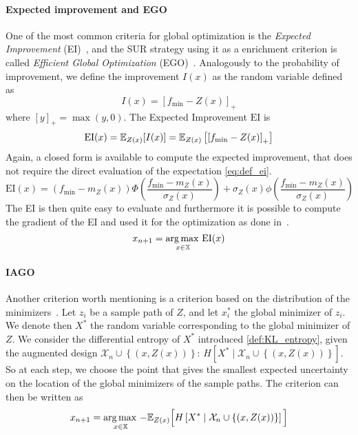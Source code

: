\documentclass[../../Main_ManuscritThese.tex]{subfiles}
\begin{document}
\paragraph{Expected improvement and EGO}
One of the most common criteria for global optimization is the \emph{Expected Improvement} (EI)~\cite{mockus_bayesian_1974}, and the SUR strategy using it as a enrichment criterion is called \emph{Efficient Global Optimization} (EGO)~\cite{jones_efficient_1998}.
Analogously to the probability of improvement, we define the improvement $I(x)$ as the random variable defined as
\begin{equation}
  \label{eq:def_improvement}
  I(x) = {\left[f_{\min} - Z(x)\right]}_+
\end{equation}
where $[y]_+ = \max(y, 0)$.
The Expected Improvement $\mathrm{EI}$ is 
\begin{align}
  \label{eq:def_ei}
  \mathrm{EI}(x) = \mathbb{E}_{Z(x)}[I(x)]  = \mathbb{E}_{Z(x)}\left[\left[f_{\min} - Z(x) \right]_+\right]
\end{align}
Again, a closed form is available to compute the expected improvement, that does not require the direct evaluation of the expectation \cref{eq:def_ei}.
\begin{equation}
  \mathrm{EI}(x) = \left(f_{\min} - m_Z(x)\right) \Phi\left(\frac{f_{\min} - m_Z(x)}{\sigma_Z(x)}\right) + \sigma_Z(x) \phi\left(\frac{f_{\min} - m_Z(x)}{\sigma_Z(x)}\right)
\end{equation}
The EI is then quite easy to evaluate and furthermore it is possible to compute the gradient of the EI and used it for the optimization as done in~\cite{pardalos_differentiating_2015}.
\begin{equation}
  x_{n+1} = \operatorname*{arg\,max \,}_{x\in \mathbb{X}} \mathrm{EI}(x)
\end{equation}

\paragraph{IAGO}
\label{ssec:IAGO} Another criterion worth mentioning is a criterion based on the distribution of the minimizers~\cite{villemonteix_informational_2006,hennig_entropy_2011}.
Let $z_i$ be a sample path of $Z$, and let $x_i^*$ the global minimizer of $z_i$.
We denote then $X^*$ the random variable corresponding to the global minimizer of $Z$.
We consider the differential entropy of $X^*$ introduced \cref{def:KL_entropy}, given the augmented design $\mathcal{X}_n \cup \left\{\left(x,Z(x)\right)\right\}$: $H[X^*\mid \mathcal{X}_n \cup \left\{(x, Z(x))\right\}]$.
 So at each step, we choose the point that gives the smallest expected uncertainty on the location of the global minimizers of the sample paths.
The criterion can then be written as
\begin{equation}
  x_{n+1}= \operatorname*{arg\,max \,}_{x \in \mathbb{X}} -\mathbb{E}_{Z(x)}\Big[H\left[X^* \mid \mathcal{X}_n \cup \left\{(x, Z(x))\right\} \right]\Big]
\end{equation}
\end{document}

